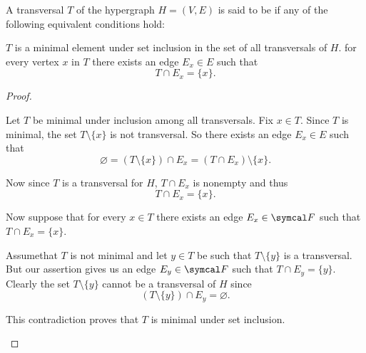 \begin{definition}\label{def:minimal_hypergraph_transversal}
  A transversal \( T \) of the hypergraph \( H = (V, E) \) is said to be  if any of the following equivalent conditions hold:
  \begin{defenum}
     \( T \) is a minimal element under set inclusion in the set of all transversals of \( H \).
     for every vertex \( x \) in \( T \) there exists an edge \( E_x \in E \) such that
    \begin{equation*}
      T \cap E_x = \{ x \}.
    \end{equation*}
  \end{defenum}
\end{definition}
\begin{proof}\mbox{}
  \begin{description}
     Let \( T \) be minimal under inclusion among all transversals. Fix \( x \in T \). Since \( T \) is minimal, the set \( T \setminus \{ x \} \) is not transversal. So there exists an edge \( E_x \in E \) such that
    \begin{equation*}
      \varnothing = (T \setminus \{ x \}) \cap E_x = (T \cap E_x) \setminus \{ x \}.
    \end{equation*}

    Now since \( T \) is a transversal for \( H \), \( T \cap E_x \) is nonempty and thus
    \begin{equation*}
      T \cap E_x = \{ x \}.
    \end{equation*}

     Now suppose that for every \( x \in T \) there exists an edge \( E_x \in \Cal{F} \) such that \( T \cap E_x = \{ x \} \).

    Assume\LEM that \( T \) is not minimal and let \( y \in T \) be such that \( T \setminus \{ y \} \) is a transversal. But our assertion gives us an edge \( E_y \in \Cal{F} \) such that \( T \cap E_y = \{ y \} \). Clearly the set \( T \setminus \{ y \} \) cannot be a transversal of \( H \) since
    \begin{equation*}
      (T \setminus \{ y \}) \cap E_y = \varnothing.
    \end{equation*}

    This contradiction proves that \( T \) is minimal under set inclusion.
  \end{description}
\end{proof}

